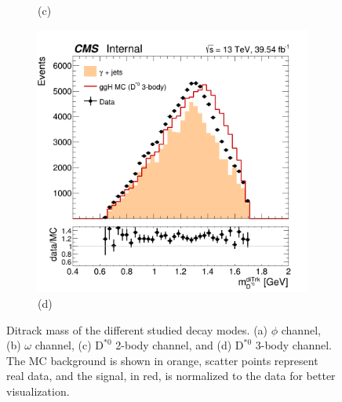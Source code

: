 \begin{figure}[!ht]
\begin{subfigure}[t]{0.50\mylength}
        \vspace*{-0.2cm}
        \caption{\footnotesize (c)}
    \end{subfigure}%
    \begin{subfigure}[t]{0.50\mylength}
        \centering
        \includegraphics[width=0.49\mylength]{resources/plots/D0Star_3body_ditrk_mass.png}
        \vspace*{-0.2cm}
        \caption{\footnotesize (d)}
    \end{subfigure}%
\caption{Ditrack mass of the different studied decay modes. (a) $\phi$ channel, (b) $\omega$ channel, (c) $\text{D}^{*0}$ 2-body channel, and (d) $\text{D}^{*0}$ 3-body channel. The MC background is shown in orange, scatter points represent real data, and the signal, in red, is normalized to the data for better visualization.}
\label{fig:ditrack_mass_data}
    \vspace*{-0.0cm}
\end{figure}

